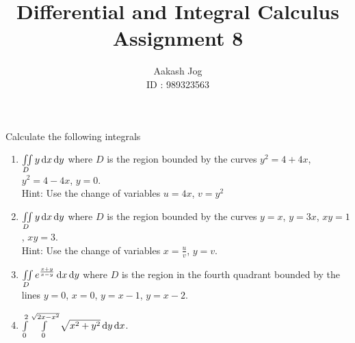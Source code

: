 \documentclass[fleqn, a4paper, 11pt, oneside]{amsart}
\title
{
	Differential and Integral Calculus\\
	Assignment 8
}
\author
{
	Aakash Jog\\
	ID : 989323563
}
\date{\formatdate{28}{5}{2015}}
\theoremstyle{definition}
\theoremstyle{theorem}
\begin{document}
	
\maketitle

\begin{question}
	Calculate the following integrals
	\begin{enumerate}
		\item
			$\iint\limits_{D} y \dif x \dif y$ where $D$ is the region bounded by the curves $y^2 = 4 + 4 x$, $y^2 = 4 - 4 x$, $y = 0$.\\
			Hint: Use the change of variables $u = 4 x$, $v = y^2$
		\item
			$\iint\limits_{D} y \dif x \dif y$ where $D$ is the region bounded by the curves $y = x$, $y = 3 x$, $x y = 1$, $x y = 3$.\\
			Hint: Use the change of variables $x = \frac{u}{v}$, $y = v$.
		\item $\iint\limits_{D} e^{\frac{x + y}{x - y}} \dif x \dif y$ where $D$ is the region in the fourth quadrant bounded by the lines $y = 0$, $x = 0$, $y = x - 1$, $y = x - 2$.
		\item $\int\limits_{0}^{2} \int\limits_{0}^{\sqrt{2 x - x^2}} \sqrt{x^2 + y^2} \dif y \dif x$.
	\end{enumerate}
\end{question}
\end{document}
